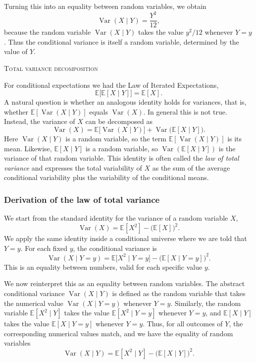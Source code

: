 Turning this into an equality between random variables, we obtain
\[
\operatorname{Var}(X \mid Y)
=
\frac{Y^{2}}{12},
\]
because the random variable \(\operatorname{Var}(X \mid Y)\) takes the value \(y^{2}/12\) whenever \(Y = y\).  
Thus the conditional variance is itself a random variable, determined by the value of \(Y\).

\bigskip
\textsc{Total variance decomposition}

For conditional expectations we had the Law of Iterated Expectations,
\[
\mathbb{E}\big[\mathbb{E}[X \mid Y]\big] = \mathbb{E}[X].
\]
A natural question is whether an analogous identity holds for variances, that is, whether \(\mathbb{E}[\operatorname{Var}(X \mid Y)]\) equals \(\operatorname{Var}(X)\).  
In general this is not true.  
Instead, the variance of \(X\) can be decomposed as
\[
\operatorname{Var}(X)
=
\mathbb{E}\big[\operatorname{Var}(X \mid Y)\big]
+
\operatorname{Var}\big(\mathbb{E}[X \mid Y]\big).
\]
Here \(\operatorname{Var}(X \mid Y)\) is a random variable, so the term \(\mathbb{E}[\operatorname{Var}(X \mid Y)]\) is its mean.  
Likewise, \(\mathbb{E}[X \mid Y]\) is a random variable, so \(\operatorname{Var}(\mathbb{E}[X \mid Y])\) is the variance of that random variable.  
This identity is often called the \textit{law of total variance} and expresses the total variability of \(X\) as the sum of the average conditional variability plus the variability of the conditional means.

\newpage
\subsubsection{Derivation of the law of total variance}

We start from the standard identity for the variance of a random variable \(X\),
\[
\operatorname{Var}(X)
=
\mathbb{E}[X^{2}]
-
\big(\mathbb{E}[X]\big)^{2}.
\]
We apply the same identity inside a conditional universe where we are told that \(Y = y\).  
For each fixed \(y\), the conditional variance is
\[
\operatorname{Var}(X \mid Y = y)
=
\mathbb{E}\big[X^{2} \mid Y = y\big]
-
\big(\mathbb{E}[X \mid Y = y]\big)^{2}.
\]
This is an equality between numbers, valid for each specific value \(y\).

We now reinterpret this as an equality between random variables.  
The abstract conditional variance \(\operatorname{Var}(X \mid Y)\) is defined as the random variable that takes the numerical value \(\operatorname{Var}(X \mid Y = y)\) whenever \(Y = y\).  
Similarly, the random variable \(\mathbb{E}[X^{2} \mid Y]\) takes the value \(\mathbb{E}[X^{2} \mid Y = y]\) whenever \(Y = y\), and \(\mathbb{E}[X \mid Y]\) takes the value \(\mathbb{E}[X \mid Y = y]\) whenever \(Y = y\).  
Thus, for all outcomes of \(Y\), the corresponding numerical values match, and we have the equality of random variables
\[
\operatorname{Var}(X \mid Y)
=
\mathbb{E}[X^{2} \mid Y]
-
\big(\mathbb{E}[X \mid Y]\big)^{2}.
\]

